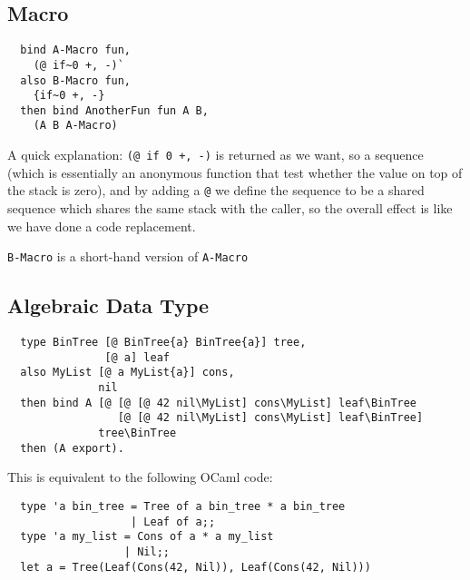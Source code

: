 \documentclass{book}
\begin{document}
\subsection{Macro}
\begin{verbatim}
  bind A-Macro fun,
    (@ if~0 +, -)`
  also B-Macro fun,
    {if~0 +, -}
  then bind AnotherFun fun A B,
    (A B A-Macro)
\end{verbatim}

A quick explanation: \texttt{(@ if~0 +, -)} is returned as we want, so a sequence (which is essentially an anonymous function that test whether the value on top of the stack is zero), and by adding a \texttt{@} we define the sequence to be a shared sequence which shares the same stack with the caller, so the overall effect is like we have done a code replacement.

\texttt{B-Macro} is a short-hand version of \texttt{A-Macro}

\subsection{Algebraic Data Type}
\begin{verbatim}
  type BinTree [@ BinTree{a} BinTree{a}] tree,
               [@ a] leaf
  also MyList [@ a MyList{a}] cons,
              nil
  then bind A [@ [@ [@ 42 nil\MyList] cons\MyList] leaf\BinTree
                 [@ [@ 42 nil\MyList] cons\MyList] leaf\BinTree]
              tree\BinTree
  then (A export).
\end{verbatim}

This is equivalent to the following OCaml code:
\begin{verbatim}
  type 'a bin_tree = Tree of a bin_tree * a bin_tree
                   | Leaf of a;;
  type 'a my_list = Cons of a * a my_list
                  | Nil;;
  let a = Tree(Leaf(Cons(42, Nil)), Leaf(Cons(42, Nil)))
\end{verbatim}
\end{document}
